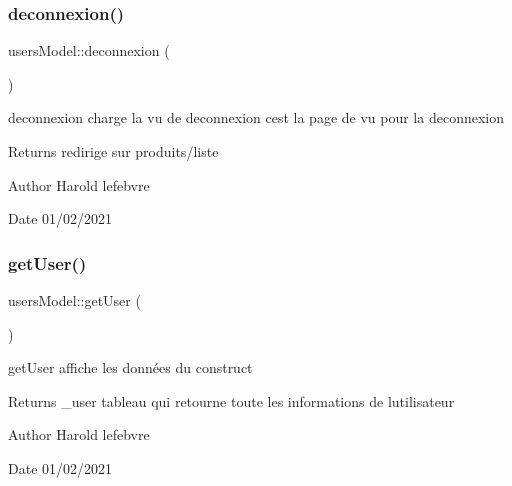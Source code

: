 \subsubsection{\texorpdfstring{deconnexion()}{deconnexion()}}
{\footnotesize\ttfamily users\+Model\+::deconnexion (\begin{DoxyParamCaption}{ }\end{DoxyParamCaption})}



deconnexion charge la vu de deconnexion c\textquotesingle{}est la page de vu pour la deconnexion 

\begin{DoxyReturn}{Returns}
redirige sur produits/liste 
\end{DoxyReturn}
\begin{DoxyAuthor}{Author}
Harold lefebvre 
\end{DoxyAuthor}
\begin{DoxyDate}{Date}
01/02/2021 
\end{DoxyDate}
\mbox{\label{classusers_model_aa5a342b8ea5229f90754660446a4cb08}} 
\subsubsection{\texorpdfstring{get\+User()}{getUser()}}
{\footnotesize\ttfamily users\+Model\+::get\+User (\begin{DoxyParamCaption}{ }\end{DoxyParamCaption})}



get\+User affiche les données du construct 

\begin{DoxyReturn}{Returns}
\+\_\+user tableau qui retourne toute les informations de l\textquotesingle{}utilisateur 
\end{DoxyReturn}
\begin{DoxyAuthor}{Author}
Harold lefebvre 
\end{DoxyAuthor}
\begin{DoxyDate}{Date}
01/02/2021 
\end{DoxyDate}
\mbox{\label{classusers_model_ae3e80f2e571d867274c8c4f94092322f}} 
